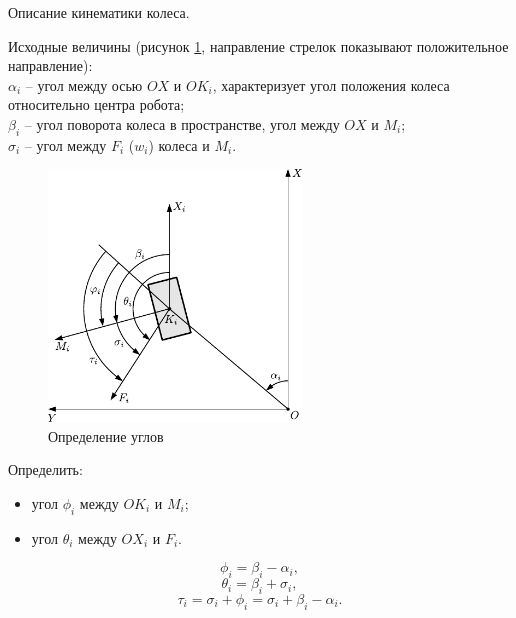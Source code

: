 \documentclass[a4paper,12pt]{article}
\begin{document}
\begin{lemma}
    Описание кинематики колеса.

    Исходные величины (рисунок \ref{fig:lemma1}, направление стрелок показывают положительное направление): \\
    \(\alpha_i\) -- угол между осью \(OX\) и \(OK_i\), характеризует угол положения колеса относительно центра робота; \\
    \(\beta_i\) -- угол поворота колеса в пространстве, угол между \(OX\) и \(M_i\); \\
    \(\sigma_i\) -- угол между \(F_i\) (\(w_i\)) колеса и \(M_i\).

    \begin{figure}[H]
        \centering
        \includegraphics[width=0.6\textwidth]{lemma1.pdf}
        \caption{Определение углов}
        \label{fig:lemma1}
    \end{figure}

    Определить:
    \begin{itemize}
        \item угол \(\phi_i\) между \(OK_i\) и \(M_i\);
        \item угол \(\theta_i\) между \(OX_i\) и \(F_i\).
    \end{itemize}

    \[
        \phi_i = \beta_i - \alpha_i
    ,\]
    \[
        \theta_i = \beta_i + \sigma_i    
    ,\]
    \[
        \tau_i = \sigma_i + \phi_i = \sigma_i + \beta_i - \alpha_i
    .\]
\end{lemma}
\end{document}
